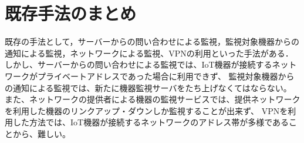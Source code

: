 \section{既存手法のまとめ}
	既存の手法として，サーバーからの問い合わせによる監視，監視対象機器からの通知による監視，ネットワークによる監視、VPNの利用といった手法がある．
	しかし、サーバーからの問い合わせによる監視では、IoT機器が接続するネットワークがプライベートアドレスであった場合に利用できず、
	監視対象機器からの通知による監視では、新たに機器監視サーバをたち上げなくてはならない。
	また、ネットワークの提供者による機器の監視サービスでは、提供ネットワークを利用した機器のリンクアップ・ダウンしか監視することが出来ず、
	VPNを利用した方法では、IoT機器が接続するネットワークのアドレス帯が多様であることから、難しい。
	
	







